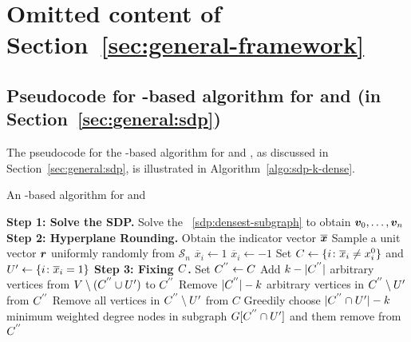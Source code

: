 \section{Omitted content of Section~\ref{sec:general-framework}}
\label{appendix:general}

\subsection{Pseudocode for {\sdp}-based algorithm for \kdense and \dskc (in Section~\ref{sec:general:sdp})}
\label{appendix:densest-subgraph:sdp:pseudocode}

The pseudocode for the {\sdp}-based algorithm for \kdense and \dskc, as discussed in Section~\ref{sec:general:sdp}, 
is illustrated in Algorithm~\ref{algo:sdp-k-dense}.

\begin{algorithm}[H]
\caption{An \sdp-based algorithm for \kdense and \dskc}
\label{algo:sdp-k-dense}
\begin{algorithmic}[1]
\State \textbf{Step 1: Solve the SDP.} Solve the \sdp~\eqref{sdp:densest-subgraph} to obtain $\bm{v}_0, \ldots, \bm{v}_n$
\State \textbf{Step 2: Hyperplane Rounding.} Obtain the indicator vector $\overline{\bm{x}}$
\State Sample a unit vector $\bm{r}$ uniformly randomly from $\mathcal{S}_n$
\State $\overline{x}_i \gets 1$
\Else
\State $\overline{x}_i \gets -1$
\EndIf
\EndFor
\State Set $C \gets \{i \colon \overline{x}_i \neq x^0_i\}$ and
$U' \gets \{i \colon \overline{x}_i = 1\}$
\State \textbf{Step 3: Fixing $C$.}  Set $C^{''} \gets C$
\State Add $k - \lvert C^{''}\rvert$ arbitrary vertices from $V \setminus (C^{''} \cup U')$ to $\FixSelectSet$
\State Remove $\lvert C^{''}\rvert - k$ arbitrary vertices in $C^{''} \setminus U'$ from $\FixSelectSet$
\Else
\State Remove all vertices in $C^{''} \setminus U'$ from $C$
\State Greedily choose $\lvert C^{''} \cap U'\rvert - k$ minimum weighted
	degree nodes in subgraph $G[C^{''} \cap U']$ and them remove from $\FixSelectSet$
\EndIf
\EndIf
\EndFor
\State \Return{$\FixSelectSet$}
\end{algorithmic}
\end{algorithm}

